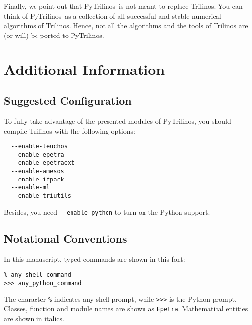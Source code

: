 \documentclass[10pt,relax]{SANDreport}
\newcommand{\PyTrilinos}{{PyTrilinos}}
\begin{document}
Finally, we point out that \PyTrilinos\ is not meant to replace Trilinos. You
can think of \PyTrilinos\ as a collection of all successful and stable
numerical algorithms of Trilinos.  Hence, not all the algorithms and the tools
of Trilinos are (or will) be ported to \PyTrilinos. 




\appendix
\section{Additional Information}
\label{sec:additional}
\subsection{Suggested Configuration}
\label{sec:suggested}

To fully take advantage of the presented modules of \PyTrilinos, you should
compile Trilinos with the following options:
\begin{verbatim}
  --enable-teuchos    
  --enable-epetra     
  --enable-epetraext  
  --enable-amesos    
  --enable-ifpack     
  --enable-ml         
  --enable-triutils   
\end{verbatim}
Besides, you need \verb!--enable-python! to turn on the Python support. 

\subsection{Notational Conventions}
\label{sec:notational}

In this manuscript, typed commands are shown in this font:
\begin{verbatim}
% any_shell_command
>>> any_python_command
\end{verbatim}
The character \verb!%! indicates any shell prompt, while \verb!>>>! is the
Python prompt. Classes, function and module names are shown as \verb!Epetra!.
Mathematical entities are shown in italics.
\end{document}
